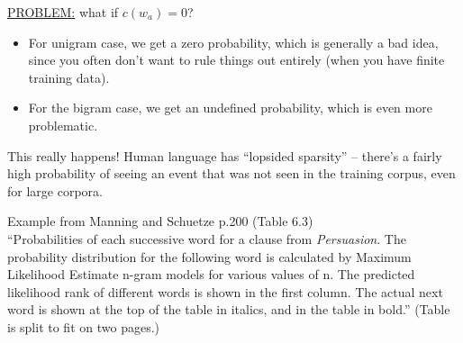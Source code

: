 \documentclass[11pt,titlepage]{article}
\begin{document}
\underline{PROBLEM:} what if $c(w_a) = 0$?
\begin{itemize}
\item For unigram case, we get a zero probability, which is generally a bad
idea, since you often don't want to rule things
out entirely (when you have finite training data).
\item For the bigram case, we get an undefined probability, which is even
more problematic.
\end{itemize}
This really happens!  
Human language has ``lopsided sparsity'' -- there's a fairly high
probability of seeing an event that was not seen in the training corpus, even
for large corpora.  

\vskip 0.1in
Example from Manning and Schuetze p.200 (Table 6.3)\\
{\Large ``Probabilities of each successive word for a clause from 
\textit{Persuasion}. The probability distribution for the following word is calculated by Maximum Likelihood Estimate n-gram models for various values of n. The predicted likelihood rank of different words is shown in the first column. The actual next word is shown at the top of the table in italics, and in the table in bold.''}
(Table is split to fit on two pages.)
\end{document}
